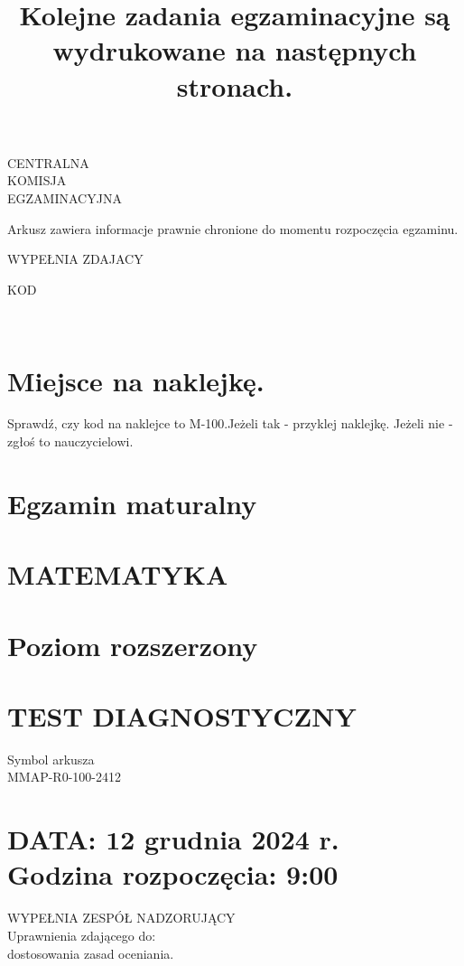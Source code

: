 \documentclass[10pt]{article}
\title{Kolejne zadania egzaminacyjne są wydrukowane na następnych stronach. }
\author{}
\date{}
\begin{document}
\maketitle
CENTRALNA\\
KOMISJA\\
EGZAMINACYJNA

Arkusz zawiera informacje prawnie chronione do momentu rozpoczęcia egzaminu.

WYPEŁNIA ZDAJACY

KOD

\begin{center}
\begin{tabular}{|l|l|}
\hline
 &  \\
\hline
\end{tabular}
\end{center}

\begin{center}
\begin{tabular}{|l|l|l|l|l|l|l|l|l|l|l|}
\hline
 &  &  &  &  &  &  &  &  &  &  \\
\hline
\end{tabular}
\end{center}

\section*{Miejsce na naklejkę.}
 Sprawdź, czy kod na naklejce to M-100.Jeżeli tak - przyklej naklejkę. Jeżeli nie - zgłoś to nauczycielowi.

\section*{Egzamin maturalny}
\section*{MATEMATYKA}
\section*{Poziom rozszerzony}
\section*{TEST DIAGNOSTYCZNY}
Symbol arkusza\\
MMAP-R0-100-2412

\section*{DATA: \(\mathbf{1 2}\) grudnia 2024 r. \\
 Godzina rozpoczęcia: 9:00}
WYPEŁNIA ZESPÓŁ NADZORUJĄCY\\
Uprawnienia zdającego do:\\
dostosowania zasad oceniania.
\end{document}
